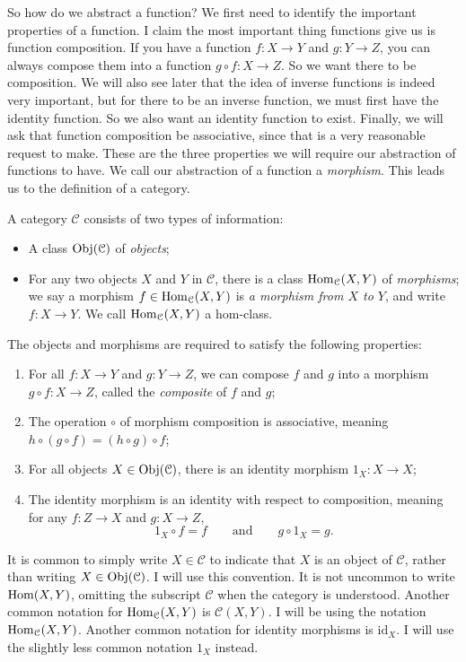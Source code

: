 So how do we abstract a function? We first need to identify the important properties of a function. I claim the most important thing functions give us is function composition. If you have a function $f : X \to Y$ and $g : Y \to Z$, you can always compose them into a function $g\circ f : X \to Z$. So we want there to be composition. We will also see later that the idea of inverse functions is indeed very important, but for there to be an inverse function, we must first have the identity function. So we also want an identity function to exist. Finally, we will ask that function composition be associative, since that is a very reasonable request to make. These are the three properties we will require our abstraction of functions to have. We call our abstraction of a function a \emph{morphism}. This leads us to the definition of a category.

\begin{definition}[Category]\label{dfn:1}
	A category $\mathcal{C} $ consists of two types of information:
	\begin{itemize}
		\item A class $\operatorname{Obj}(\mathcal{C} ) $ of \emph{objects};
		\item For any two objects $X$ and $Y$ in $\mathcal{C} $, there is a class $\operatorname{Hom}_{\mathcal{C} }(X, Y) $ of \emph{morphisms}; we say a morphism $f\in \operatorname{Hom}_{\mathcal{C} }(X, Y) $ is \emph{a morphism from $X$ to $Y$}, and write $f : X \to Y$. We call $\operatorname{Hom}_{\mathcal{C} }(X, Y) $ a hom-class.
	\end{itemize}
	The objects and morphisms are required to satisfy the following properties:
	\begin{enumerate}
		\item For all $f : X \to Y$ and $g : Y \to Z$, we can compose $f$ and $g$ into a morphism $g\circ f : X \to Z$, called the \emph{composite} of $f$ and $g$;
		\item The operation $\circ $ of morphism composition is associative, meaning $h\circ (g\circ f)=(h\circ g)\circ f$;
		\item For all objects $X\in \operatorname{Obj}(\mathcal{C} ) $, there is an identity morphism $1_X : X \to X$;
		\item The identity morphism is an identity with respect to composition, meaning for any $f : Z \to X$ and $g : X \to Z$,
			\[
				1_X\circ f=f\qquad \text{and} \qquad g\circ 1_X=g
			.\]
	\end{enumerate}
\end{definition}

It is common to simply write $X\in\mathcal{C} $ to indicate that $X$ is an object of $\mathcal{C} $, rather than writing $X\in \operatorname{Obj}(\mathcal{C} ) $. I will use this convention. It is not uncommon to write $\operatorname{Hom}(X, Y) $, omitting the subscript $\mathcal{C}$ when the category is understood. Another common notation for $\operatorname{Hom}_{\mathcal{C} }(X, Y) $ is $\mathcal{C} (X,Y)$. I will be using the notation $\operatorname{Hom}_{\mathcal{C} }(X, Y) $. Another common notation for identity morphisms is $\mathrm{id} _X$. I will use the slightly less common notation $1_X$ instead.

